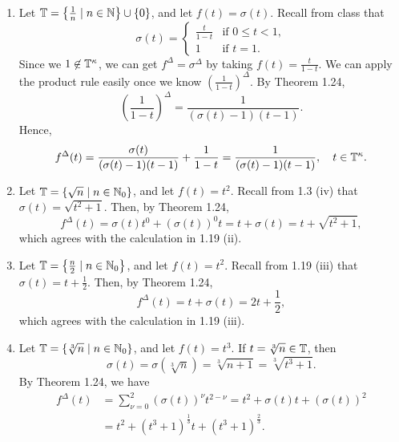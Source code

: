 \documentclass[nonumber]{homework}
\begin{document}
	\begin{enumerate}[label={\bf (\roman*)}]
		\item Let $\mathbb{T} = \left\{\frac{1}{n} \mid n \in \mathbb{N}\right\}\cup\{0\}$, and let $f(t) = \sigma(t)$. Recall from class that
		\begin{equation*}
			\sigma(t) = \begin{cases}
				\frac{t}{1-t} & \text{if } 0 \le t < 1, \\
				1 & \text{if } t = 1.
			\end{cases}
		\end{equation*}
		Since we $1 \not \in \mathbb{T}^\kappa$, we can get $f^\Delta = \sigma^\Delta$ by taking $f(t) = \frac{t}{1-t}$. We can apply the product rule easily once we know $\left(\frac{1}{1-t}\right)^\Delta$. By Theorem 1.24,
		\begin{equation*}
			\left(\frac{1}{1-t}\right)^\Delta = \frac{1}{(\sigma(t) -1)(t-1)}.
		\end{equation*}
		Hence,
		\begin{equation*}
			f^\Delta(t) = \frac{\sigma(t)}{(\sigma(t) - 1)(t-1)} + \frac{1}{1-t} = \frac{1}{(\sigma(t) -1)(t-1)}, \quad t \in \mathbb{T}^\kappa.
		\end{equation*}
		
		\item Let $\mathbb{T} = \{\sqrt{n}\mid n \in \mathbb{N}_0\}$, and let $f(t) = t^2$. Recall from 1.3 (iv) that $\sigma(t) = \sqrt{t^2+1}$. Then, by Theorem 1.24,
		\begin{equation*}
			f^\Delta(t) = \sigma(t)t^0 + (\sigma(t))^0t = t + \sigma(t) = t + \sqrt{t^2+1},
		\end{equation*}
		which agrees with the calculation in 1.19 (ii).
		
		\item Let $\mathbb{T} = \left\{\frac{n}{2} \mid n \in \mathbb{N}_0\right\}$, and let $f(t) = t^2$. Recall from 1.19 (iii) that $\sigma(t) = t + \frac{1}{2}$. Then, by Theorem 1.24,
		\begin{equation*}
			f^\Delta(t) = t + \sigma(t) = 2t + \frac{1}{2},
		\end{equation*}
		which agrees with the calculation in 1.19 (iii).
		
		\item Let $\mathbb{T} = \{\sqrt[3]{n} \mid n \in \mathbb{N}_0\}$, and let $f(t) = t^3$. If $t = \sqrt[3]{n} \in \mathbb{T}$, then
		\begin{equation*}
			\sigma(t) = \sigma(\sqrt[3]{n}) = \sqrt[3]{n+1} = \sqrt[3]{t^3+1}.
		\end{equation*}
		By Theorem 1.24, we have
		\begin{align*}
			f^\Delta(t) &= \sum_{\nu=0}^2 (\sigma(t))^\nu t^{2-\nu} = t^2 + \sigma(t)t + (\sigma(t))^2 \\
			&= t^2 + (t^3+1)^\frac{1}{3}t + (t^3+1)^\frac{2}{3}.
		\end{align*}
		
	\end{enumerate}
	
\end{document}
